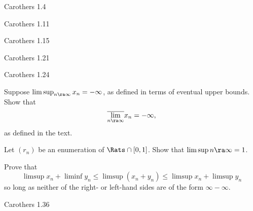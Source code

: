 \documentclass[minion]{homework}
\begin{document}
\begin{aproblems}

\hproblem Carothers 1.4

\hproblem Carothers 1.11

\hproblem Carothers 1.15

\hproblem Carothers 1.21

\hproblem Carothers 1.24

\hproblem Suppose $\limsup_{n\ra\infty} x_n = -\infty$, as defined in terms
of eventual upper bounds.  Show that $$
\overline{\lim_{n\ra\infty}} x_n =-\infty,
$$ as defined in the text.

\hproblem Let $(r_n)$ be an enumeration of $\Rats\cap [0,1]$.  Show that
$\limsup{n\ra\infty} = 1$.


\hproblem Prove that
$$
\limsup x_n + \liminf y_n \le \limsup (x_n+y_n) \le \limsup x_n + \limsup y_n
$$
so long as neither of the right- or left-hand sides are of the form $\infty-\infty$.

\hproblem Carothers 1.36

\end{aproblems}
\end{document}
